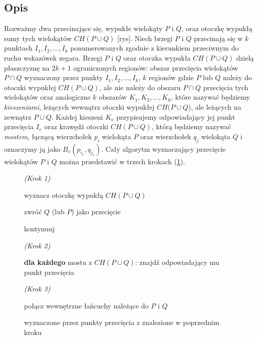 \subsection{Opis}
Rozważmy dwa przecinające się, wypukłe wielokąty $P$ i $Q$, oraz
otoczkę wypukłą sumy tych wielokątów $CH(P \cup Q)$ [rys]. Niech
brzegi $P$ i $Q$ przecinają się w $k$ punktach $I_1, I_2, \ldots, I_k$
ponumerowanych zgodnie z kierunkiem przeciwnym do ruchu wskazówek
zegara. Brzegi $P$ i $Q$ oraz otoczka wypukła $CH(P \cup Q)$ dzielą
płaszczyznę na $2k + 1$ ograniczonych regionów: obszar przecięcia
wielokątów $P \cap Q$ wyznaczony przez punkty $I_1, I_2, \ldots, I_k$,
$k$ regionów gdzie $P$ lub $Q$ należy do otoczki wypukłej $CH(P \cup
Q)$, ale nie należy do obszaru $P \cap Q$ przecięcia tych wielokątów
oraz analogiczne $k$ obszarów $K_1, K_2, \ldots, K_k$, które nazywać
będziemy \emph{kieszeniami}, leżących wewnątrz otoczki wypukłej $CH(P
\cup Q$), ale leżących na zewnątrz $P \cup Q$. Każdej kieszeni $K_v$
przypisujemy odpowiadający jej punkt przecięcia $I_v$ oraz krawędź
otoczki $CH(P \cup Q)$, którą będziemy nazywać \emph{mostem}, łączącą
wierzchołek $p_i$ wielokąta $P$ oraz wierzchołek $q_j$ wielokąta $Q$ i
oznaczymy ją jako $B_{v}(p_{i_v}, q_{j_v})$. Cały algorytm
wyznaczający przecięcie wielokątów $P$ i $Q$ można przedstawić w
trzech krokach (\ref{alg:interconpol}).

\begin{figure}[htp]
\begin{algorithmic}[1]

\State \emph{(Krok 1)}

\State wyznacz otoczkę wypukłą $CH(P \cup Q)$

\State

    \State zwróć $Q$ (lub $P$) jako przecięcie

    \Else
    \State kontynuuj
\EndIf

\State

\State \emph{(Krok 2)}

\State \textbf{dla każdego} mostu z $CH(P \cup Q)$:
\State \hspace{\algorithmicindent} znajdź odpowiadający mu punkt
przecięcia

\State

\State \emph{(Krok 3)}

\State połącz wewnętrzne łańcuchy należące do $P$ i $Q$

wyznaczone przez punkty przecięcia z znalezione w poprzednim kroku

\EndProcedure
\end{algorithmic}
\caption{\label{alg:interconpol}}
\end{figure}


